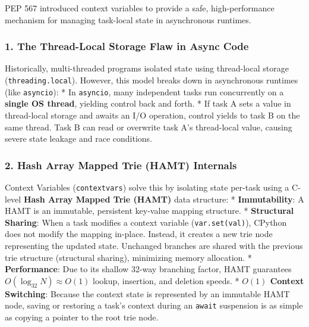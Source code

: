 PEP 567 introduced context variables to provide a safe, high-performance
mechanism for managing task-local state in asynchronous runtimes.

\hypertarget{the-thread-local-storage-flaw-in-async-code}{%
\subsubsection{1. The Thread-Local Storage Flaw in Async
Code}\label{the-thread-local-storage-flaw-in-async-code}}

Historically, multi-threaded programs isolated state using thread-local
storage (\passthrough{\lstinline!threading.local!}). However, this model
breaks down in asynchronous runtimes (like
\passthrough{\lstinline!asyncio!}): * In
\passthrough{\lstinline!asyncio!}, many independent tasks run
concurrently on a \textbf{single OS thread}, yielding control back and
forth. * If task A sets a value in thread-local storage and awaits an
I/O operation, control yields to task B on the same thread. Task B can
read or overwrite task A's thread-local value, causing severe state
leakage and race conditions.

\hypertarget{hash-array-mapped-trie-hamt-internals}{%
\subsubsection{2. Hash Array Mapped Trie (HAMT)
Internals}\label{hash-array-mapped-trie-hamt-internals}}

Context Variables (\passthrough{\lstinline!contextvars!}) solve this by
isolating state per-task using a C-level \textbf{Hash Array Mapped Trie
(HAMT)} data structure: * \textbf{Immutability}: A HAMT is an immutable,
persistent key-value mapping structure. * \textbf{Structural Sharing}:
When a task modifies a context variable
(\passthrough{\lstinline!var.set(val)!}), CPython does not modify the
mapping in-place. Instead, it creates a new trie node representing the
updated state. Unchanged branches are shared with the previous trie
structure (structural sharing), minimizing memory allocation. *
\textbf{Performance}: Due to its shallow 32-way branching factor, HAMT
guarantees \(O(\log_{32} N) \approx O(1)\) lookup, insertion, and
deletion speeds. * \textbf{\(O(1)\) Context Switching}: Because the
context state is represented by an immutable HAMT node, saving or
restoring a task's context during an \passthrough{\lstinline!await!}
suspension is as simple as copying a pointer to the root trie node.

